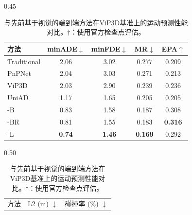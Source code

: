 \begin{table}[t]

    \centering
    \caption{SparseAD在nuScenes \texttt{val} 数据集上的运动规划器综合性能。-R：带雷达点云输入。}
    \vspace{-5pt}
    \begin{subtable}[h]{0.45\textwidth}
    \tiny

    {
    \begin{tabular}{l|cccc}
			\toprule
			方法 & minADE$\downarrow$ & minFDE$\downarrow$ & MR$\downarrow$ & EPA$\uparrow$ \\
			\midrule
            Traditional\cite{gu2023vip3d} &2.06&3.02&0.277&0.209\\
			PnPNet~\cite{liang2020pnpnet} & 2.04 & 3.03 & 0.271 & 0.213 \\
			ViP3D~\cite{gu2023vip3d} & 2.03 & 2.90 & 0.239 & 0.236 \\
			{UniAD}\dag~\cite{hu2023planning} & 1.17&	1.65&	0.205&	0.205 \\
	        \midrule
	        \rowcolor[gray]{.9} \model-B & 0.83&	1.58	&0.187& 0.308\\
	        \rowcolor[gray]{.9} \model-BR & 0.81&	1.55&	0.183& \textbf{0.316}\\
	         \rowcolor[gray]{.9} \model-L &\textbf{0.74}	&\textbf{1.46}&	\textbf{0.169}& 0.292\\
			\bottomrule
		\end{tabular}
	        }
	        \caption{与先前基于视觉的端到端方法在ViP3D\cite{gu2023vip3d}基准上的运动预测性能对比。$\dag$：使用官方检查点\cite{hu2023planning}评估。}
		\label{tab:motion_vip3d_val_set}
    \end{subtable}
    \hfill
    \begin{subtable}[h]{0.50\textwidth}
    \tiny

    \begin{tabular}{l|cccc|cccc}
    \toprule
    \multirow{2}{*}{方法} &
    \multicolumn{4}{c|}{L2 (m) $\downarrow$} &
    \multicolumn{4}{c|}{碰撞率 (\%) $\downarrow$} \\


\end{tabular}
\end{subtable}
\end{table}
